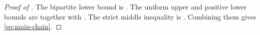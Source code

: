 \begin{proof}[Proof of ]
The bipartite lower bound is .  The uniform upper and
positive lower bounds are  together with
.  The strict middle inequality is
.  Combining them gives \eqref{eq:main-chain}.
\end{proof}

